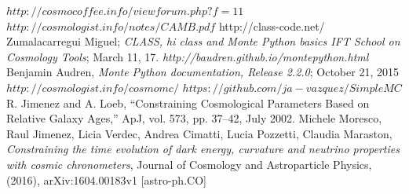 \documentclass[onecolumn,           %
               showpacs,            %
               preprintnumbers,     %
               aps,                 %
               prl,          	    %
               letterpaper,             %
               superscriptaddress,      %
               nofootinbib,         %
               tightenlines,        %
               floats,floatfix      %
               ,usenatbib,
               ]{revtex4-1}
\begin{document}
\begin{thebibliography}{9}
$http://cosmocoffee.info/viewforum.php?f=11$
 $http://cosmologist.info/notes/CAMB.pdf$
 http://class-code.net/
Zumalacarregui Miguel; \textit{CLASS, hi class and Monte Python basics IFT School on Cosmology Tools}; March 11, 17.
\textit{http://baudren.github.io/montepython.html}
Benjamin Audren, \textit{Monte Python documentation, Release 2.2.0}; October 21, 2015
$http://cosmologist.info/cosmomc/$	
$https://github.com/ja-vazquez/SimpleMC$
%
%
%
%
%
%
R. Jimenez and A. Loeb, “Constraining Cosmological Parameters Based on Relative Galaxy Ages,”
ApJ, vol. 573, pp. 37–42, July 2002.
Michele Moresco, Raul Jimenez, Licia Verdec, Andrea Cimatti, Lucia Pozzetti, Claudia Maraston, \textit{Constraining the time evolution of dark energy, curvature and neutrino properties with cosmic chronometers}, Journal of Cosmology and Astroparticle Physics, (2016), arXiv:1604.00183v1 [astro-ph.CO]


\end{thebibliography}
\end{document}
